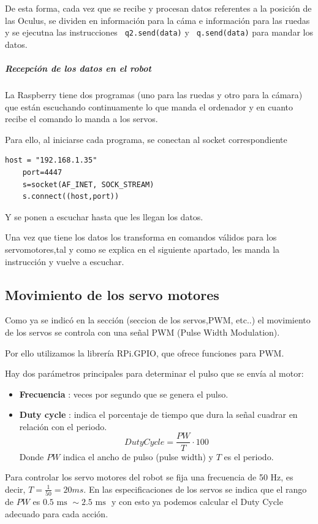 \documentclass[twoside, 12pt]{epstfg}
\begin{document}
De esta forma, cada vez que se recibe y procesan datos referentes a la posición de las Oculus, se dividen en información para la cáma e información para las ruedas y se ejecutna las instrucciones \texttt{ q2.send(data)}  y \texttt{ q.send(data)} para mandar los datos.
\subparagraph{Recepción de los datos en el robot}

La Raspberry tiene dos programas (uno para las ruedas y otro para la
cámara) que están escuchando continuamente lo que manda el ordenador y en
cuanto recibe el comando lo manda a los servos.

Para ello, al iniciarse cada programa, se conectan al socket correspondiente
\lstset{language=python, breaklines=true, basicstyle=\footnotesize}
\begin{lstlisting}[frame=single]
	host = "192.168.1.35"
	port=4447
	s=socket(AF_INET, SOCK_STREAM)
	s.connect((host,port))
\end{lstlisting}

Y se ponen a escuchar hasta que les llegan los datos.

Una vez que tiene los datos los transforma en comandos válidos para los servomotores,tal y como se explica en el siguiente apartado, les manda la instrucción y vuelve a escuchar.


\subsection{Movimiento de los servo motores}


Como ya se indicó en la sección (seccion de los servos,PWM, etc..) el movimiento de los servos se controla con una señal PWM (Pulse Width Modulation).

Por ello utilizamos la librería RPi.GPIO, que ofrece funciones para PWM.

Hay dos parámetros principales para determinar el pulso que se envía al motor:
\begin{itemize}
	\item \textbf{Frecuencia} : veces por segundo que se genera el pulso.
	\item \textbf{Duty cycle} : indica el porcentaje de tiempo que dura la señal cuadrar en relación con el periodo.
	$$DutyCycle = \frac{PW}{T}\cdot 100$$
	Donde $PW$ indica el ancho de pulso (pulse width) y $T$ es el periodo.
	
\end{itemize}

Para controlar los servo motores del robot se fija una frecuencia de 50 Hz, es decir, $T = \frac{1}{50} = 20 ms$.
En las especificaciones de los servos se indica que el rango de $PW$ es $0.5 \text{ ms } \sim 2.5\text{ ms }$ y con esto ya podemos calcular el Duty Cycle adecuado para cada acción.
\end{document}
